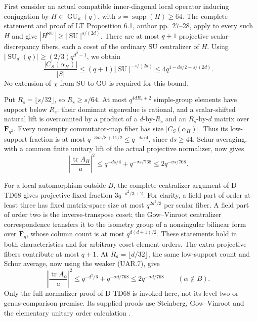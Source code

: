First consider an actual compatible inner-diagonal local operator
inducing conjugation by \(H\in\operatorname{GU}_d(q)\), with
\(s=\operatorname{supp}(H)\ge64\). The complete statement and proof
of LT Proposition 6.1, author pp.~27--28, apply to every such \(H\)
\cite[Proposition~6.1 and its complete proof]{UNW:LT2024}
and give \(|H^{\operatorname{SU}}|\ge|\operatorname{SU}|^{s/(2d)}\).
There are at most \(q+1\) projective scalar-discrepancy fibers, each
a coset of the ordinary SU centralizer of \(H\). Using
\(|\operatorname{SU}_d(q)|\ge(2/3)q^{d^2-1}\), we obtain
\[
 \frac{|C_S(\alpha_H)|}{|S|}
 \le(q+1)|\operatorname{SU}|^{-s/(2d)}
 \le4q^{1-ds/2+s/(2d)}.
 \tag{UAR.8}
\]
No extension of \(\chi\) from SU to GU is required for this bound.

Put \(R_s=\lfloor s/32\rfloor\), so \(R_s\ge s/64\).
At most \(q^{4dR_s+2}\) simple-group elements have support below
\(R_s\): their dominant eigenvalue is rational, and a scalar-shifted
natural lift is overcounted by a product of a \(d\)-by-\(R_s\) and an
\(R_s\)-by-\(d\) matrix over \(\mathbf F_{q^2}\).
Every nonempty commutator-map fiber has size \(|C_S(\alpha_H)|\).
Thus its low-support fraction is at most
\(q^{-3ds/8+11/2}\le q^{-ds/4}\), since \(ds\ge44\).
Schur averaging, with a common finite unitary lift of the actual
projective normalizer, now gives
\[
 \left|\frac{\operatorname{tr}A_H}{a}\right|^2
       \le q^{-ds/4}+q^{-\sigma s/768}
       \le2q^{-\sigma s/768}.
 \tag{UAR.9}
\]

For a local automorphism outside \(B\), the complete centralizer
argument of D-TD68 gives projective fixed fraction
\(3q^{-d^2/3+2}\). For clarity, a field part of order at least three
has fixed matrix-space size at most \(q^{2d^2/3}\) per scalar fiber.
A field part of order two is the inverse-transpose coset; the
Gow--Vinroot centralizer correspondence
\cite[complete Section~2, author pp.~3--6]{UPL:GowVinroot2008}
transfers it to the isometry
group of a nonsingular bilinear form over \(\mathbf F_q\), whose
column count is at most \(q^{d(d+1)/2}\). These statements hold in
both characteristics and for arbitrary coset-element orders.
The extra projective fibers contribute at most \(q+1\).
At \(R_d=\lfloor d/32\rfloor\), the same low-support count and
Schur average, now using the weaker (UAR.7), give
\[
 \left|\frac{\operatorname{tr}A_\alpha}{a}\right|^2
       \le q^{-d^2/6}+q^{-\sigma d/768}
       \le2q^{-\sigma d/768}\qquad(\alpha\notin B).
 \tag{UAR.10}
\]
Only the full-normalizer proof of D-TD68 is invoked here, not its
level-two or genus-comparison premise. Its supplied proofs use
Steinberg, Gow--Vinroot and the elementary unitary order calculation
\cite[pp.~114--118]{OS:Taylor1992}.

